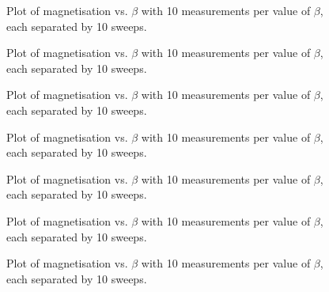 \documentclass[a4paper]{article}
\begin{document}
\clearpage
\begin{figure}[ht!]
	\centering
	
	\caption{Plot of magnetisation vs. $\beta$ with 10 measurements per value of $\beta$, each separated by 10 sweeps.}\label{Fig_mag_plot_350_2}
\end{figure}

\clearpage
\begin{figure}[ht!]
	\centering
	
	\caption{Plot of magnetisation vs. $\beta$ with 10 measurements per value of $\beta$, each separated by 10 sweeps.}\label{Fig_mag_plot_450_2}
\end{figure}

\clearpage
\begin{figure}[ht!]
	\centering
	
	\caption{Plot of magnetisation vs. $\beta$ with 10 measurements per value of $\beta$, each separated by 10 sweeps.}\label{Fig_mag_plot_550_2}
\end{figure}

\clearpage
\begin{figure}[ht!]
	\centering
	
	\caption{Plot of magnetisation vs. $\beta$ with 10 measurements per value of $\beta$, each separated by 10 sweeps.}\label{Fig_mag_plot_650_2}
\end{figure}

\clearpage
\begin{figure}[ht!]
	\centering
	
	\caption{Plot of magnetisation vs. $\beta$ with 10 measurements per value of $\beta$, each separated by 10 sweeps.}\label{Fig_mag_plot_750_2}
\end{figure}

\clearpage
\begin{figure}[ht!]
	\centering
	
	\caption{Plot of magnetisation vs. $\beta$ with 10 measurements per value of $\beta$, each separated by 10 sweeps.}\label{Fig_mag_plot_850_2}
\end{figure}

\clearpage
\begin{figure}[ht!]
	\centering
	
	\caption{Plot of magnetisation vs. $\beta$ with 10 measurements per value of $\beta$, each separated by 10 sweeps.}\label{Fig_mag_plot_1500_2}
\end{figure}
\end{document}
